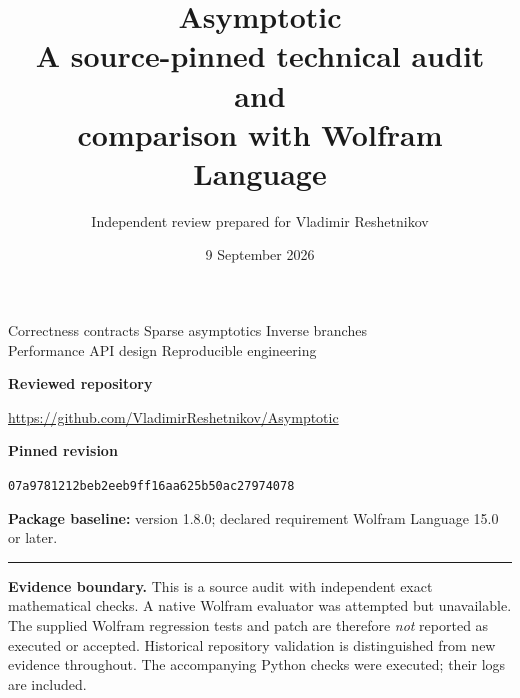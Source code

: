 \documentclass[11pt,letterpaper]{article}
\title{\textbf{Asymptotic}\\[0.3em]{\Large A source-pinned technical audit and\\ comparison with Wolfram Language}}
\author{Independent review prepared for Vladimir Reshetnikov}
\date{9 September 2026}
\newcommand{\commit}{\texttt{07a9781212beb2eeb9ff16aa625b50ac27974078}}
\begin{document}
\begin{titlepage}
\color{ink}
\maketitle
\thispagestyle{empty}
\vspace{0.4in}
\begin{center}
\large Correctness contracts \quad Sparse asymptotics \quad Inverse branches\\[0.5em]
\large Performance \quad API design \quad Reproducible engineering
\end{center}
\vfill
\color{black}
\textbf{Reviewed repository}\par
\url{https://github.com/VladimirReshetnikov/Asymptotic}\par
\textbf{Pinned revision}\par
\commit\par
\textbf{Package baseline:} version 1.8.0; declared requirement Wolfram Language 15.0 or later.\par
\medskip
\hrule
\medskip
\textbf{Evidence boundary.} This is a source audit with independent exact mathematical checks. A native Wolfram evaluator was attempted but unavailable. The supplied Wolfram regression tests and patch are therefore \emph{not} reported as executed or accepted. Historical repository validation is distinguished from new evidence throughout. The accompanying Python checks were executed; their logs are included.
\end{titlepage}
\end{document}
